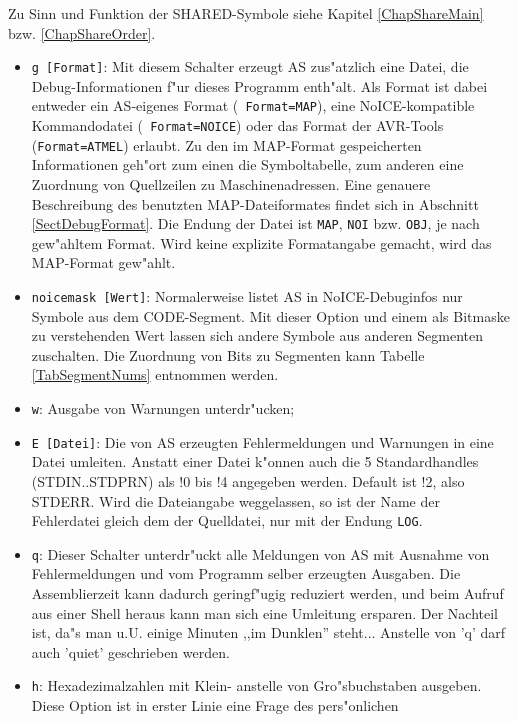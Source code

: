 \documentclass[12pt,a4paper,twoside]{report}
\newcommand{\tty}[1]{{\tt #1}}
\begin{document}
Zu Sinn und Funktion der SHARED-Symbole siehe Kapitel \ref{ChapShareMain}
bzw. \ref{ChapShareOrder}.
\begin{itemize}
\item{\tty{g [Format]}: Mit diesem Schalter erzeugt AS zus"atzlich eine
      Datei, die Debug-Informationen f"ur dieses Programm enth"alt.
      Als Format ist dabei entweder ein AS-eigenes Format ({\tt
      Format=MAP}), eine NoICE-kompatible Kommandodatei ({\tt
      Format=NOICE}) oder das Format der AVR-Tools ({\tt Format=ATMEL})
      erlaubt.  Zu den im MAP-Format gespeicherten
      Informationen geh"ort zum einen die Symboltabelle, zum anderen eine
      Zuordnung von Quellzeilen zu Maschinenadressen.  Eine genauere
      Beschreibung des benutzten MAP-Dateiformates findet sich in
      Abschnitt \ref{SectDebugFormat}.  Die Endung der Datei ist
      \tty{MAP}, \tty{NOI} bzw. \tty{OBJ}, je nach gew"ahltem Format.
      Wird keine explizite Formatangabe gemacht, wird das MAP-Format
      gew"ahlt.}
\item{\tty{noicemask [Wert]}: Normalerweise listet AS in NoICE-Debuginfos
      nur Symbole aus dem CODE-Segment.  Mit dieser Option und einem als
      Bitmaske zu verstehenden Wert lassen sich andere Symbole aus
      anderen Segmenten zuschalten.  Die Zuordnung von Bits zu Segmenten
      kann Tabelle \ref{TabSegmentNums} entnommen werden.}
\item{\tty{w}: Ausgabe von Warnungen unterdr"ucken;}
\item{\tty{E [Datei]}: Die von AS erzeugten Fehlermeldungen und Warnungen
      in eine Datei umleiten.  Anstatt einer Datei k"onnen auch die 5
      Standardhandles (STDIN..STDPRN) als !0 bis !4 angegeben werden.
      Default ist !2, also STDERR. Wird die Dateiangabe weggelassen,
      so ist der Name der Fehlerdatei gleich dem der Quelldatei, nur
      mit der Endung \tty{LOG}.}
\item{\tty{q}: Dieser Schalter unterdr"uckt alle Meldungen von AS mit
      Ausnahme von Fehlermeldungen und vom Programm selber erzeugten
      Ausgaben.  Die Assemblierzeit kann dadurch geringf"ugig reduziert
      werden, und beim Aufruf aus einer Shell heraus kann man sich eine
      Umleitung ersparen.  Der Nachteil ist, da"s man u.U. einige Minuten
      ,,im Dunklen'' steht...  Anstelle von 'q' darf auch 'quiet' geschrieben
      werden.}
\item{\tty{h}: Hexadezimalzahlen mit Klein- anstelle von Gro"sbuchstaben ausgeben.
      Diese Option ist in erster Linie eine Frage des pers"onlichen
}
\end{itemize}
\end{document}
